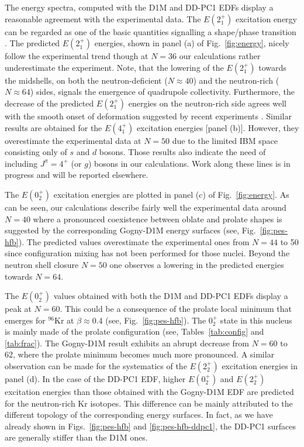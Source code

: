 \documentclass[twocolumn,showpacs,amsmath,amssymb,superscriptaddress]{revtex4-1}
\begin{document}
The energy spectra, computed with the D1M and DD-PC1 EDFs display 
a reasonable agreement with the experimental data. The 
$E(2^+_1)$
excitation energy can be regarded as 
one of the basic quantities  signalling  a shape/phase transition
\cite{CasBook,cejnar2010}. The predicted $E(2^+_1)$  energies, shown in 
panel (a) of Fig.~\ref{fig:energy}, nicely follow the 
experimental trend though at $N=36$ our calculations 
rather underestimate the experiment. Note, that the 
lowering of the $E(2^+_1)$ towards the midshells, on both 
the neutron-deficient  ($N\approx 40$) and the 
neutron-rich ($N\approx 64$) sides, signals the 
emergence of quadrupole collectivity. Furthermore, the 
decrease of the predicted $E(2^+_1)$ energies on the 
neutron-rich side agrees well with 
the smooth onset of deformation suggested by  recent
experiments \cite{albers2012,albers2013}.  Similar 
results are obtained for the 
$E(4^+_1)$ excitation energies [panel (b)]. However, they
overestimate the experimental data at $N=50$ due to 
the limited IBM space consisting only of $s$ and $d$ bosons.
Those results also indicate the need of including 
$J^{\pi}=4^+$ (or $g$) bosons in our calculations. Work 
along these lines is in progress and will be reported
elsewhere. 


The  $E(0^+_2)$ excitation energies are plotted in 
panel (c) of Fig.~\ref{fig:energy}. As can be seen, our 
calculations describe fairly well the  experimental data
around $N=40$ where a pronounced coexistence
between oblate and prolate shapes is suggested 
by the corresponding Gogny-D1M energy 
surfaces (see, Fig.~\ref{fig:pes-hfb}).
The predicted values overestimate
the experimental  ones from $N=44$ to 50 since configuration mixing
has not been  performed for those nuclei. Beyond the neutron shell closure $N=50$
one observes a lowering in the predicted 
energies towards $N=64$.

  
The  $E(0^+_2)$ values obtained with both the D1M and DD-PC1 EDFs display
 a peak at
$N=60$. This could be a consequence of the prolate local 
minimum  that emerges for $^{96}$Kr 
at $\beta\approx 0.4$ (see,
Fig.~\ref{fig:pes-hfb}). The $0^+_2$ state in this nucleus is mainly
made of the prolate configuration (see, Tables~\ref{tab:config} and \ref{tab:frac}). 
The Gogny-D1M result exhibits an abrupt decrease  from
$N=60$ to 62, where the prolate minimum becomes much more pronounced. 
A similar observation can be made for the systematics of the $E(2^+_2)$
excitation energies in panel (d). In the case of the 
DD-PC1 EDF, higher $E(0^+_2)$ and $E(2^+_2)$ excitation energies 
than those obtained with the Gogny-D1M EDF
are predicted for the neutron-rich Kr isotopes.
This difference can be mainly attributed to the different topology of
the corresponding energy surfaces. 
In fact, as we have already shown in Figs.~\ref{fig:pes-hfb} and
\ref{fig:pes-hfb-ddpc1}, the DD-PC1 surfaces are generally stiffer  than
the D1M ones. 
\end{document}
